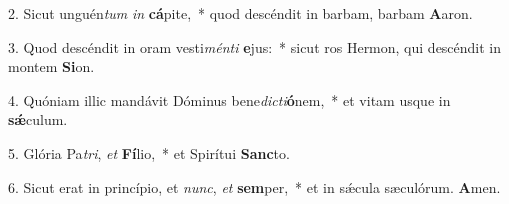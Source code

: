 2. Sicut unguén\textit{tum} \textit{in} \textbf{cá}pite,~*  quod descéndit in barbam, barbam \textbf{A}aron.\

3. Quod descéndit in oram vesti\textit{mén}\textit{ti} \textbf{e}jus:~*  sicut ros Hermon, qui descéndit in montem \textbf{Si}on.\

4. Quóniam illic mandávit Dóminus bene\textit{dic}\textit{ti}\textbf{ó}nem,~*  et vitam usque in \textbf{sǽ}culum.\

5. Glória Pa\textit{tri}, \textit{et} \textbf{Fí}lio,~*  et Spirítui \textbf{Sanc}to.\

6. Sicut erat in princípio, et \textit{nunc}, \textit{et} \textbf{sem}per,~*  et in sǽcula sæculórum. \textbf{A}men.\

